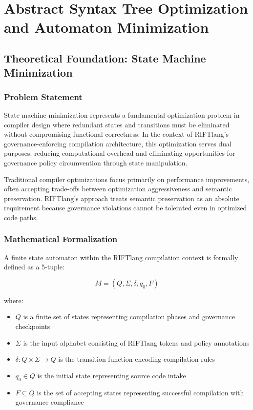\chapter{Abstract Syntax Tree Optimization and Automaton Minimization}

\section{Theoretical Foundation: State Machine Minimization}

\subsection{Problem Statement}

State machine minimization represents a fundamental optimization problem in compiler design where redundant states and transitions must be eliminated without compromising functional correctness. In the context of RIFTlang's governance-enforcing compilation architecture, this optimization serves dual purposes: reducing computational overhead and eliminating opportunities for governance policy circumvention through state manipulation.

Traditional compiler optimizations focus primarily on performance improvements, often accepting trade-offs between optimization aggressiveness and semantic preservation. RIFTlang's approach treats semantic preservation as an absolute requirement because governance violations cannot be tolerated even in optimized code paths.

\subsection{Mathematical Formalization}

A finite state automaton within the RIFTlang compilation context is formally defined as a 5-tuple:

\begin{equation}
M = (Q, \Sigma, \delta, q_0, F)
\end{equation}

where:
\begin{itemize}
\item $Q$ is a finite set of states representing compilation phases and governance checkpoints
\item $\Sigma$ is the input alphabet consisting of RIFTlang tokens and policy annotations
\item $\delta: Q \times \Sigma \rightarrow Q$ is the transition function encoding compilation rules
\item $q_0 \in Q$ is the initial state representing source code intake
\item $F \subseteq Q$ is the set of accepting states representing successful compilation with governance compliance
\end{itemize}

